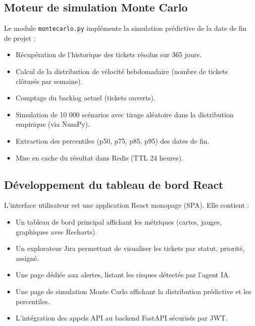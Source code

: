 \subsection{Moteur de simulation Monte Carlo}
Le module \texttt{montecarlo.py} implémente la simulation prédictive de la date de fin de projet :
\begin{itemize}
    \renewcommand{\labelitemi}{—}
    \item Récupération de l’historique des tickets résolus sur 365 jours.
    \item Calcul de la distribution de vélocité hebdomadaire (nombre de tickets clôturés par semaine).
    \item Comptage du backlog actuel (tickets ouverts).
    \item Simulation de 10 000 scénarios avec tirage aléatoire dans la distribution empirique (via NumPy).
    \item Extraction des percentiles (p50, p75, p85, p95) des dates de fin.
    \item Mise en cache du résultat dans Redis (TTL 24 heures).
\end{itemize}

\subsection{Développement du tableau de bord React}
L’interface utilisateur est une application React monopage (SPA). Elle contient :
\begin{itemize}
    \renewcommand{\labelitemi}{—}
    \item Un tableau de bord principal affichant les métriques (cartes, jauges, graphiques avec Recharts).
    \item Un explorateur Jira permettant de visualiser les tickets par statut, priorité, assigné.
    \item Une page dédiée aux alertes, listant les risques détectés par l’agent IA.
    \item Une page de simulation Monte Carlo affichant la distribution prédictive et les percentiles.
    \item L’intégration des appels API au backend FastAPI sécurisés par JWT.
\end{itemize}

